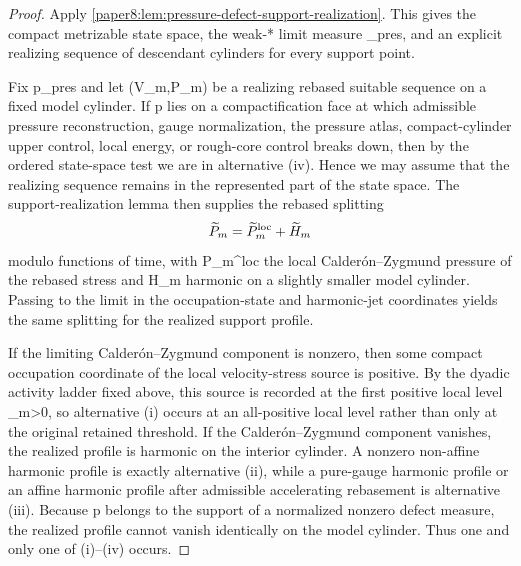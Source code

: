 \documentclass[11pt]{amsart}
\def\({}%
\def\){}%
\def\mathfrak#1{#1}%
\theoremstyle{plain}
\theoremstyle{definition}
\theoremstyle{remark}
\begin{document}
\begin{proof}
Apply \cref{paper8:lem:pressure-defect-support-realization}.  This gives the
compact metrizable state space, the weak-* limit measure
\(\Pi_{\rm pres}\), and an explicit realizing sequence of descendant cylinders
for every support point.

Fix \(\mathfrak p\in{}\Pi_{\rm pres}\) and let
\((\widetilde V_m,\widetilde P_m)\) be a realizing rebased suitable sequence on
a fixed model cylinder.  If \(\mathfrak p\) lies on a compactification face at
which admissible pressure reconstruction, gauge normalization, the pressure
atlas, compact-cylinder upper control, local energy, or rough-core control
breaks down, then by the ordered state-space test we are in alternative
\textup{(iv)}.
Hence we may assume that the realizing sequence remains in the represented part
of the state space.  The support-realization lemma then supplies the rebased
splitting
\[
  \widetilde P_m=\widetilde P_m^{\rm loc}+\widetilde H_m
\]
modulo functions of time, with \(\widetilde P_m^{\rm loc}\) the local
Calder\'on--Zygmund pressure of the rebased stress and \(\widetilde H_m\)
harmonic on a slightly smaller model cylinder.  Passing to the limit in the
occupation-state and harmonic-jet coordinates yields the same splitting for the
realized support profile.

If the limiting Calder\'on--Zygmund component is nonzero, then some compact
occupation coordinate of the local velocity-stress source is positive.  By the
dyadic activity ladder fixed above, this source is recorded at the first
positive local level \(\eta_m>0\), so alternative \textup{(i)} occurs at an
all-positive local level rather than only at the original retained threshold.
If the
Calder\'on--Zygmund component vanishes, the realized profile is harmonic on the
interior cylinder.  A nonzero non-affine harmonic profile is exactly
alternative \textup{(ii)}, while a pure-gauge harmonic profile or an affine
harmonic profile after admissible accelerating rebasement is
alternative \textup{(iii)}.  Because \(\mathfrak p\) belongs to the support of a
normalized nonzero defect measure, the realized profile cannot vanish
identically on the model cylinder.  Thus one and only one of
\textup{(i)}--\textup{(iv)} occurs.
\end{proof}
\end{document}
